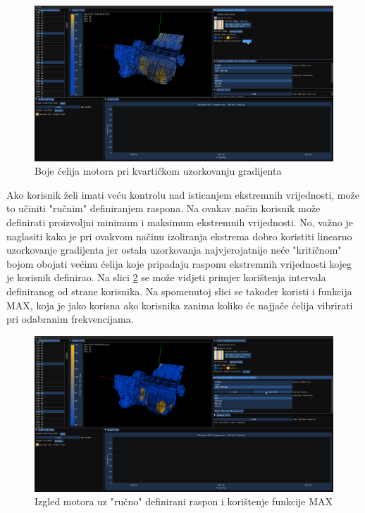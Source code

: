 \documentclass[times, utf8, diplomski]{fer}
\begin{document}
\begin{figure} [H]
	\centering
    \includegraphics[width=\textwidth]{demonstration/quartic_sampling_normal_mode.png}
    \caption{Boje ćelija motora pri kvartičkom uzorkovanju gradijenta}
    \label{fig:quartic-engine-colors}
\end{figure}

Ako korisnik želi imati veću kontrolu nad isticanjem ekstremnih vrijednosti, može to učiniti "ručnim" definiranjem raspona. Na ovakav način korisnik može definirati proizvoljni minimum i maksimum ekstremnih vrijednosti. No, važno je naglasiti kako je pri ovakvom načinu izoliranja ekstrema dobro koristiti linearno uzorkovanje gradijenta jer ostala uzorkovanja najvjerojatnije neće "kritičnom" bojom obojati većinu ćelija koje pripadaju rasponu ekstremnih vrijednosti kojeg je korisnik definirao. Na slici \ref{fig:custom-interval} se može vidjeti primjer korištenja intervala definiranog od strane korisnika. Na spomenutoj slici se također koristi i funkcija MAX, koja je jako korisna ako korisnika zanima koliko će najjače ćelija vibrirati pri odabranim frekvencijama.

\begin{figure} [H]
	\centering
    \includegraphics[width=\textwidth]{demonstration/custom_limits_linear_sampling.png}
    \caption{Izgled motora uz "ručno" definirani raspon i korištenje funkcije MAX}
    \label{fig:custom-interval}
\end{figure}
\end{document}

